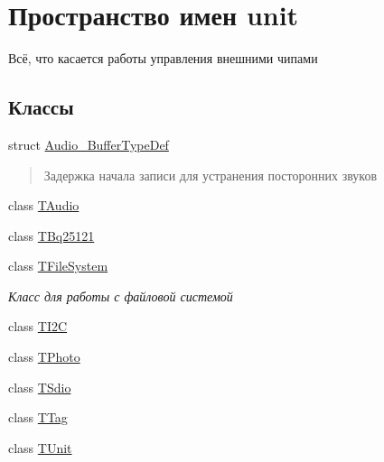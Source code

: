 \hypertarget{namespaceunit}{}\section{Пространство имен unit}
\label{namespaceunit}


Всё, что касается работы управления внешними чипами  


\subsection*{Классы}
\begin{DoxyCompactItemize}
\item 
struct \hyperlink{structunit_1_1_audio___buffer_type_def}{Audio\+\_\+\+Buffer\+Type\+Def}
\begin{DoxyCompactList}\small\item\em \begin{quote}
Задержка начала записи для устранения посторонних звуков \end{quote}
\end{DoxyCompactList}\item 
class \hyperlink{classunit_1_1_t_audio}{T\+Audio}
\item 
class \hyperlink{classunit_1_1_t_bq25121}{T\+Bq25121}
\item 
class \hyperlink{classunit_1_1_t_file_system}{T\+File\+System}
\begin{DoxyCompactList}\small\item\em Класс для работы с файловой системой \end{DoxyCompactList}\item 
class \hyperlink{classunit_1_1_t_i2_c}{T\+I2C}
\item 
class \hyperlink{classunit_1_1_t_photo}{T\+Photo}
\item 
class \hyperlink{classunit_1_1_t_sdio}{T\+Sdio}
\item 
class \hyperlink{classunit_1_1_t_tag}{T\+Tag}
\item 
class \hyperlink{classunit_1_1_t_unit}{T\+Unit}
\end{DoxyCompactItemize}
